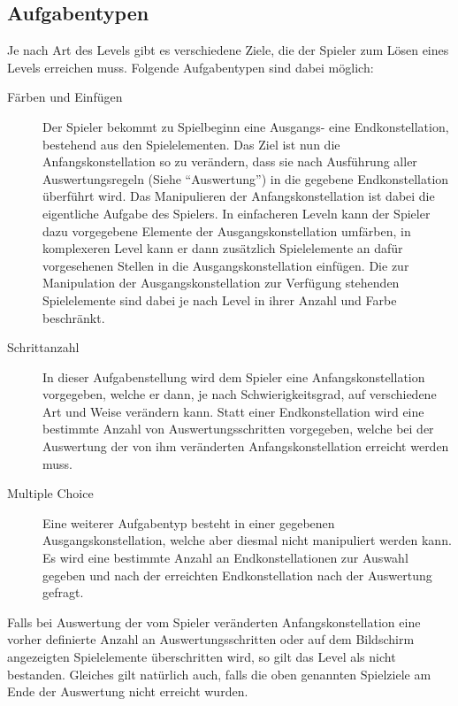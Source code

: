 \subsection{Aufgabentypen}
Je nach Art des Levels gibt es verschiedene Ziele, die der Spieler zum Lösen eines Levels erreichen muss.
Folgende Aufgabentypen sind dabei möglich:
        \begin{description}
                \item[Färben und Einfügen] Der Spieler bekommt zu Spielbeginn eine Ausgangs- eine Endkonstellation, bestehend aus den Spielelementen.
                Das Ziel ist nun die Anfangskonstellation so zu verändern, dass sie nach Ausführung aller Auswertungsregeln (Siehe "`Auswertung"') in die gegebene Endkonstellation überführt wird.
                Das Manipulieren der Anfangskonstellation ist dabei die eigentliche Aufgabe des Spielers.
                In einfacheren Leveln kann der Spieler dazu vorgegebene Elemente der Ausgangskonstellation umfärben, in komplexeren Level kann er dann zusätzlich Spielelemente an dafür vorgesehenen Stellen in die Ausgangskonstellation einfügen. 
                Die zur Manipulation der Ausgangskonstellation zur Verfügung stehenden Spielelemente sind dabei je nach Level in ihrer Anzahl und Farbe beschränkt.

                \item[Schrittanzahl] In dieser Aufgabenstellung wird dem Spieler eine Anfangskonstellation vorgegeben, welche er dann, je nach Schwierigkeitsgrad, auf verschiedene Art und Weise verändern kann.
                Statt einer Endkonstellation wird eine bestimmte Anzahl von Auswertungsschritten vorgegeben, welche bei der Auswertung der von ihm veränderten Anfangskonstellation erreicht werden muss.

                \item[Multiple Choice] Eine weiterer Aufgabentyp besteht in einer gegebenen Ausgangskonstellation, welche aber diesmal nicht manipuliert werden kann. 
                Es wird eine bestimmte Anzahl an Endkonstellationen zur Auswahl gegeben und nach der erreichten Endkonstellation nach der Auswertung gefragt.

        \end{description}

        Falls bei Auswertung der vom Spieler veränderten Anfangskonstellation eine vorher definierte Anzahl an Auswertungsschritten oder auf dem Bildschirm angezeigten Spielelemente überschritten wird, so gilt das Level als nicht bestanden. 
        Gleiches gilt natürlich auch, falls die oben genannten Spielziele am Ende der Auswertung nicht erreicht wurden.
        


